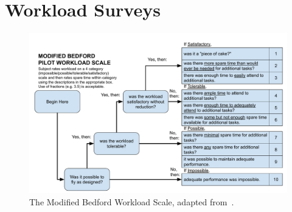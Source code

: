 \chapter{Workload Surveys} \label{appendix:workload}

\begin{figure}[tbp]
    \begin{center}
        \includegraphics[width=1.4\linewidth,angle=90]{figures/Introduction/MODIFIED_BEDFORD_PILOT_WORKLOAD_SCALE.pdf}
        \caption[The Modified Bedford Workload Scale]{The Modified Bedford Workload Scale, adapted from~\citet{roscoe_subjective_1990}.}
        \label{figure:modifiedbedford}
    \end{center}
\end{figure}


